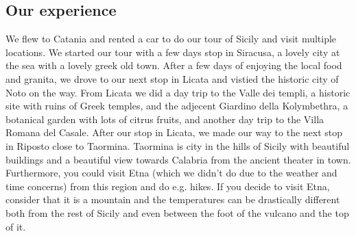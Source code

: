 \documentclass[11pt,a4paper,sans,english]{article}
\begin{document}
\subsection{Our experience}
We flew to Catania and rented a car to do our tour of Sicily and visit multiple locations. We started our tour with a few days stop in Siracusa, a lovely city at the sea with a lovely greek old town. After a few days of enjoying the local food and granita, we drove to our next stop in Licata and vistied the historic city of Noto on the way. From Licata we did a day trip to the Valle dei templi, a historic site with ruins of Greek temples, and the adjecent Giardino della Kolymbethra, a botanical garden with lots of citrus fruits, and another day trip to the Villa Romana del Casale. After our stop in Licata, we made our way to the next stop in Riposto close to Taormina. Taormina is city in the hills of Sicily with beautiful buildings and a beautiful view towards Calabria from the ancient theater in town. Furthermore, you could visit Etna (which we didn't do due to the weather and time concerns) from this region and do e.g. hikes. If you decide to visit Etna, consider that it is a mountain and the temperatures can be drastically different both from the rest of Sicily and even between the foot of the vulcano and the top of it. 
%
\end{document}
